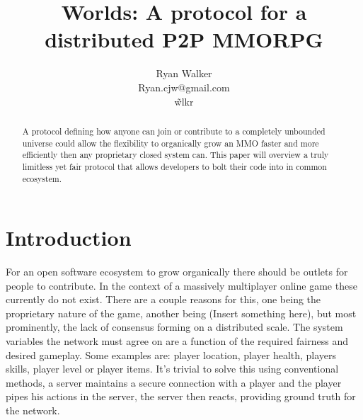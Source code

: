 \documentclass[runningheads,a4paper]{llncs}
\begin{document}
\def \SystemName {Worlds} %

\mainmatter  %

\title{\SystemName: A protocol for a distributed P2P MMORPG}

\author{Ryan Walker\\
				Ryan.cjw@gmail.com\\
				\~wlkr}


\maketitle


%  
%
%

\begin{abstract}
A protocol defining how anyone can join or contribute to a completely unbounded universe could allow the flexibility to organically grow an MMO faster and more efficiently then any proprietary closed system can. This paper will overview a truly limitless yet fair protocol that allows developers to bolt their code into in common ecosystem. 
\end{abstract}

\section{Introduction}
For an open software ecosystem to grow organically there should be outlets for people to contribute. In the context of a massively multiplayer online game these currently do not exist. There are a couple reasons for this, one being the proprietary nature of the game, another being (Insert something here), but most prominently, the lack of consensus forming on a distributed scale. The system variables the network must agree on are a function of the required fairness and desired gameplay. Some examples are: player location, player health, players skills, player level or player items. It's trivial to solve this using conventional methods, a server maintains a secure connection with a player and the player pipes his actions in the server, the server then reacts, providing ground truth for the network.
\end{document}

